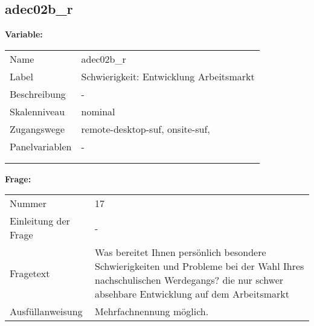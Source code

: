 	
	
	\subsection{adec02b\_r}
	\label{subSection:adec02b_r}

	\noindent\textbf{Variable:}\\
		\begin{tabular}{lL{11.3cm}}
			\label{tableVariable:adec02b_r}
			Name & adec02b\_r \\
			Label & Schwierigkeit: Entwicklung Arbeitsmarkt \\
			Beschreibung & - \\
			Skalenniveau & nominal \\
			Zugangswege &
				remote-desktop-suf,
				onsite-suf,
 \\
			Panelvariablen & -
			 \\
			 \\
 \\
		\end{tabular}

		\vspace*{1 cm}
		\noindent\textbf{Frage:}\\
		\begin{tabular}{lL{11.3cm}}
			\label{tableQuestion:adec02b_r}
			Nummer & 17 \\
			Einleitung der Frage & - \\
			Fragetext & Was bereitet Ihnen persönlich besondere Schwierigkeiten und Probleme bei der Wahl Ihres nachschulischen Werdegangs?
die nur schwer absehbare Entwicklung auf dem Arbeitsmarkt \\
			Ausfüllanweisung & Mehrfachnennung möglich. \\
		\end{tabular}





